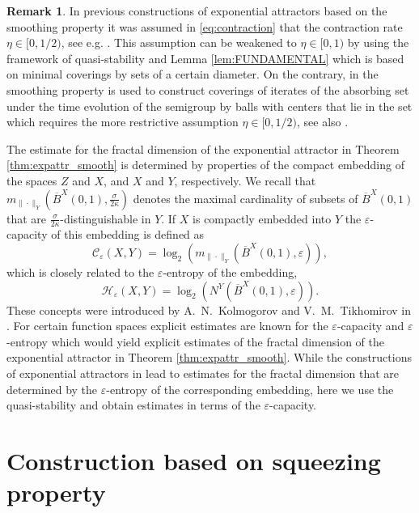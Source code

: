 \documentclass[a4paper,12pt,reqno]{amsart}
\theoremstyle{plain}
\theoremstyle{definition}
\newtheorem{rem}[lem]{Remark}
\numberwithin{equation}{section}
\begin{document}
\begin{rem}
In previous constructions of exponential attractors based on the smoothing property it was assumed in \eqref{eq:contraction} that the contraction rate $\eta\in[0,1/2)$, see e.g. \cite{EfMiZe, CzEf, CCM, CaSo}. This assumption can be weakened to $\eta\in[0,1)$ by using the framework of quasi-stability and Lemma \ref{lem:FUNDAMENTAL} which is based on minimal coverings by sets of a certain diameter. On the contrary, in \cite{EfMiZe, CzEf, CCM, CaSo} the smoothing property is used to construct coverings of iterates of the absorbing set under the time evolution of the semigroup by balls with centers that lie in the set which requires the more restrictive assumption $\eta\in[0,1/2)$, see also \cite{chueshov}.

The estimate for the fractal dimension of the exponential attractor in Theorem \ref{thm:expattr_smooth} is determined by properties of the compact embedding of the spaces $Z$ and $X$, and $X$ and $Y$, respectively. We recall that $m_{\|\cdot\|_Y}\left(\overline{B}^X(0,1),\frac{\sigma}{2\kappa}\right)$ denotes the maximal cardinality of subsets of $\overline{B}^X(0,1)$ that are $\frac{\sigma}{2\kappa}$-distinguishable in $Y$. 
If $X$ is compactly embedded into $Y$ the $\varepsilon$-capacity of this embedding is defined as 
$$\mathcal{C}_\varepsilon(X,Y)=\log_2 \left(m_{\|\cdot\|_Y}\left(\overline{B}^X(0,1),\varepsilon\right)\right),$$
which is closely related to the $\varepsilon$-entropy of the embedding,
$$\mathcal{H}_\varepsilon(X,Y)=\log_2 \left(N^Y\left(\overline{B}^X(0,1),\varepsilon\right)\right).$$
These concepts were introduced by A.~N.~Kolmogorov and V.~M.~Tikhomirov in \cite{KoTi}. 
For certain function spaces explicit estimates are known for the $\varepsilon$-capacity and $\varepsilon$-entropy which would yield explicit estimates of the fractal dimension of the exponential attractor in Theorem \ref{thm:expattr_smooth}. While the constructions of exponential attractors in \cite{EfMiZe, CzEf, CCM, CaSo, sonner2012} lead to estimates for the fractal dimension that are determined by the $\varepsilon$-entropy of the corresponding embedding, here we use the quasi-stability and obtain estimates in terms of the $\varepsilon$-capacity. 
\end{rem}

\section{Construction based on squeezing property}\label{sec:SQ}
\end{document}
